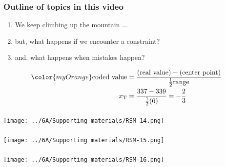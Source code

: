 \begin{frame}\frametitle{Outline of topics in this video}
	\begin{enumerate}
		\item	We keep climbing up the mountain ... \pause
		\item	but, what happens if we encounter a constraint? \pause
		\item	and, what happens when mistakes happen?\pause
	\end{enumerate}
	
	\begin{align*}
		\color{myOrange}\text{coded value} &= \dfrac{(\text{real value}) - (\text{center point})}{\tfrac{1}{2}\text{range}} \\
		x_\text{T} &= \dfrac{337 - 339}{\tfrac{1}{2}(6)} = -\dfrac{2}{3}
	\end{align*}
\end{frame}

\begin{frame}\frametitle{}
	\centerline{\texttt{[image: ../6A/Supporting materials/RSM-14.png]}}
\end{frame}

\begin{frame}\frametitle{}
	\centerline{\texttt{[image: ../6A/Supporting materials/RSM-15.png]}}
\end{frame}

\begin{frame}\frametitle{}
	\centerline{\texttt{[image: ../6A/Supporting materials/RSM-16.png]}}
\end{frame}

